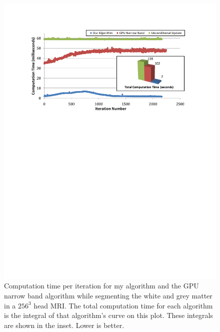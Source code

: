 \begin{figure}[t]
\centering
\includegraphics[width=6.0in]{figures/SpeedB1.pdf}
\caption{Computation time per iteration for my algorithm and the GPU narrow band algorithm while segmenting the white and grey matter in a $256^3$ head MRI. The total computation time for each algorithm is the integral of that algorithm's curve on this plot. These integrals are shown in the inset. Lower is better.}
\label{fig:speed}
\end{figure}

